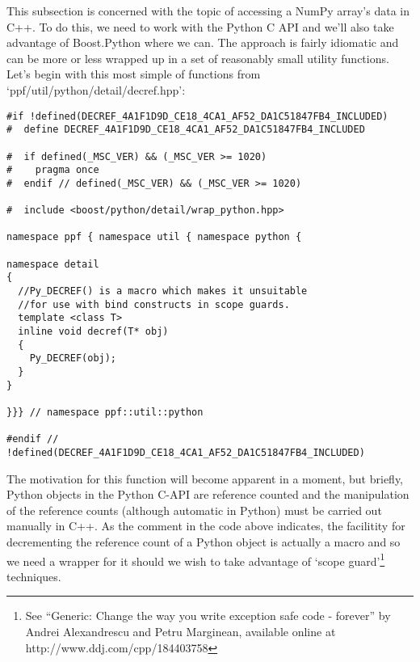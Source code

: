 This subsection is concerned with the topic of accessing a NumPy
array's data in C++. To do this, we need to work with the Python C API
and we'll also take advantage of Boost.Python where we can. The
approach is fairly idiomatic and can be more or less wrapped up in a
set of reasonably small utility functions. Let's begin with this most
simple of functions from `ppf/util/python/detail/decref.hpp':
\begin{verbatim}
#if !defined(DECREF_4A1F1D9D_CE18_4CA1_AF52_DA1C51847FB4_INCLUDED)
#  define DECREF_4A1F1D9D_CE18_4CA1_AF52_DA1C51847FB4_INCLUDED

#  if defined(_MSC_VER) && (_MSC_VER >= 1020)
#    pragma once
#  endif // defined(_MSC_VER) && (_MSC_VER >= 1020)

#  include <boost/python/detail/wrap_python.hpp>

namespace ppf { namespace util { namespace python {

namespace detail
{
  //Py_DECREF() is a macro which makes it unsuitable
  //for use with bind constructs in scope guards.
  template <class T>
  inline void decref(T* obj)
  {
    Py_DECREF(obj);
  }
}

}}} // namespace ppf::util::python

#endif // !defined(DECREF_4A1F1D9D_CE18_4CA1_AF52_DA1C51847FB4_INCLUDED)
\end{verbatim}
The motivation for this function will become apparent in a moment, but
briefly, Python objects in the Python C-API are reference counted and
the manipulation of the reference counts (although automatic in
Python) must be carried out manually in C++. As the comment in the
code above indicates, the facilitity for decrementing the reference
count of a Python object is actually a macro and so we need a wrapper
for it should we wish to take advantage of `scope guard'\footnote{See
``Generic: Change the way you write exception safe code - forever'' by
Andrei Alexandrescu and Petru Marginean, available online at
http://www.ddj.com/cpp/184403758} techniques.

